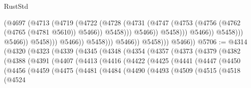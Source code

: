 \begin{lexlean}{RustStd}
\begin{coremodule}
                                                (@4697
                                                  (@4713
                                                    (@4719
                                                      (@4722
                                                        (@4728
                                                          (@4731
                                                            (@4747
                                                              (@4753
                                                                (@4756
                                                                  (@4762
                                                                    (@4765 (@4781 @5610))
                                                                    @5466))
                                                                @5458)))
                                                          @5466))
                                                      @5458)))
                                                @5466))
                                            @5458)))
                                      @5466))
                                  @5458)))
                            @5466))
                        @5458)))
                  @5466))
              @5458)))
        @5466))
@5706 := @4314
    (@4320
      (@4323
        (@4339
          (@4345
            (@4348
              (@4354
                (@4357
                  (@4373
                    (@4379
                      (@4382
                        (@4388
                          (@4391
                            (@4407
                              (@4413
                                (@4416
                                  (@4422
                                    (@4425
                                      (@4441
                                        (@4447
                                          (@4450
                                            (@4456
                                              (@4459
                                                (@4475
                                                  (@4481
                                                    (@4484
                                                      (@4490
                                                        (@4493
                                                          (@4509
                                                            (@4515
                                                              (@4518
                                                                (@4524

\end{coremodule}
\end{lexlean}
